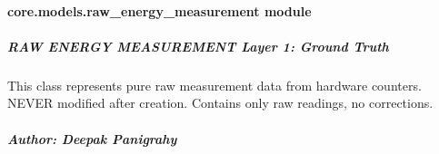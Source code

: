 \documentclass[letterpaper,10pt,english]{sphinxmanual}
\begin{document}
\sphinxstepscope


\paragraph{core.models.raw\_energy\_measurement module}
\label{\detokenize{core.models.raw_energy_measurement:module-core.models.raw_energy_measurement}}\label{\detokenize{core.models.raw_energy_measurement:core-models-raw-energy-measurement-module}}\label{\detokenize{core.models.raw_energy_measurement::doc}}

\subparagraph{RAW ENERGY MEASUREMENT \textendash{} Layer 1: Ground Truth}
\label{\detokenize{core.models.raw_energy_measurement:raw-energy-measurement-layer-1-ground-truth}}
\sphinxAtStartPar
This class represents pure raw measurement data from hardware counters.
NEVER modified after creation. Contains only raw readings, no corrections.


\subparagraph{Author: Deepak Panigrahy}
\label{\detokenize{core.models.raw_energy_measurement:author-deepak-panigrahy}}
\end{document}

